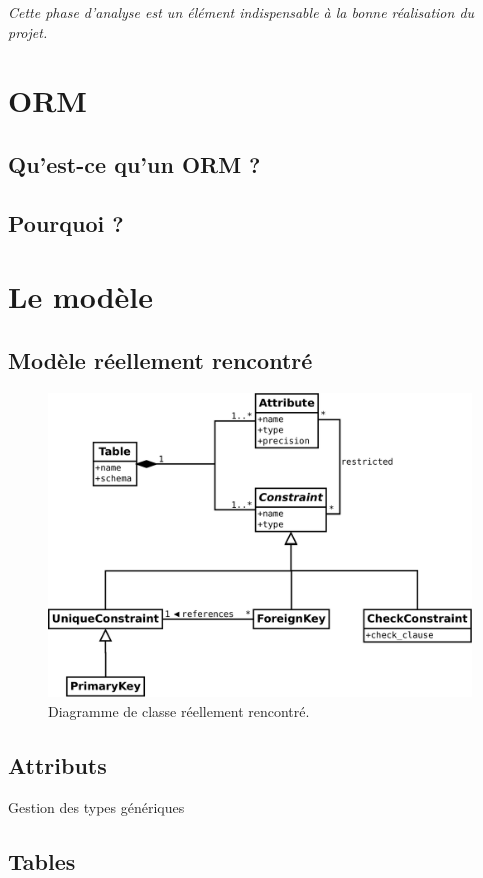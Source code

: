 \textit{Cette phase d'analyse est un élément indispensable à la bonne réalisation du projet. }

\section{ORM}
\subsection{Qu'est-ce qu'un ORM ?}
\subsection{Pourquoi ?}

\section{Le modèle}
\subsection{Modèle réellement rencontré}
\begin{figure}[H]
\centering
\includegraphics[width=\textwidth]{files/diag_class_ameliore}
\caption{Diagramme de classe réellement rencontré.}
\label{figure:diag_classe_reel}
\end{figure}
	\subsection{Attributs}
		Gestion des types génériques
	\subsection{Tables}
